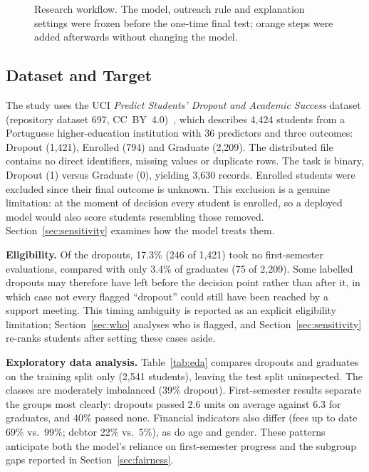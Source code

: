 \begin{figure}[t]
  \caption{Research workflow. The model, outreach rule and explanation settings were frozen before the one-time final test; orange steps were added afterwards without changing the model.}
  \label{fig:project-pipeline}
\end{figure}


\subsection{Dataset and Target}

The study uses the UCI \emph{Predict Students' Dropout and Academic Success} dataset (repository
dataset 697, CC~BY~4.0)~\citep{realinho2021uci, realinho2022predicting}, which describes 4,424
students from a Portuguese higher-education institution with 36 predictors and three outcomes:
Dropout (1,421), Enrolled (794) and Graduate (2,209). The distributed file contains no direct
identifiers, missing values or duplicate rows. The task is binary, Dropout (1) versus Graduate (0),
yielding 3,630 records. Enrolled students were excluded since their final outcome is unknown. This
exclusion is a genuine limitation: at the moment of decision every student is enrolled, so a
deployed model would also score students resembling those removed. Section~\ref{sec:sensitivity}
examines how the model treats them.

\textbf{Eligibility.} Of the dropouts, 17.3\% (246 of 1,421) took no first-semester evaluations,
compared with only 3.4\% of graduates (75 of 2,209). Some labelled dropouts may therefore have left
before the decision point rather than after it, in which case not every flagged ``dropout'' could
still have been reached by a support meeting. This timing ambiguity is reported as an explicit
eligibility limitation; Section~\ref{sec:who} analyses who is flagged, and
Section~\ref{sec:sensitivity} re-ranks students after setting these cases aside.

\textbf{Exploratory data analysis.} Table~\ref{tab:eda} compares dropouts and graduates on the
training split only (2,541 students), leaving the test split uninspected. The classes are moderately
imbalanced (39\% dropout). First-semester results separate the groups most clearly: dropouts passed
2.6 units on average against 6.3 for graduates, and 40\% passed none. Financial indicators also
differ (fees up to date 69\% vs.\ 99\%; debtor 22\% vs.\ 5\%), as do age and gender. These patterns
anticipate both the model's reliance on first-semester progress and the subgroup gaps reported in
Section~\ref{sec:fairness}.

